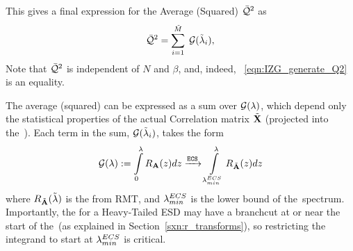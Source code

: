 This gives a final expression for the Average \LayerQuality (Squared) $\bar{\mathcal{Q}}^{2}$ as
\begin{equation}
\label{eqn:Q2_result}
\bar{\mathcal{Q}}^{2} = \sum\limits_{i=1}^{\tilde{M}}\;\mathcal{G}(\tilde{\lambda}_{i}),
\end{equation}
Note that $\bar{\mathcal{Q}}^{2}$ is independent of $N$ and $\beta$,
and, indeed, \EQN~\ref{eqn:IZG_generate_Q2} is an equality.

The average \Quality (squared) can be expressed as a sum over
\GeneratingFunctions $\mathcal{G(\lambda)}$, which depend only the statistical properties of the
actual \Teacher Correlation  matrix  $\tilde{\mathbf{X}}$ (projected into the~\ECS).
Each term in the sum, $\mathcal{G}(\tilde{\lambda}_{i})$, takes the form
\begin{equation}
\label{eqn:generating_function_A}
 \mathcal{G(\lambda)}:=\int\limits_{0}^{\lambda}R_{\mathbf{A}}(z)dz \xrightarrow{\text{\texttt{ECS}}}\int\limits_{\lambda^{ECS}_{min}}^{\lambda}R_{\tilde{\mathbf{A}}}(z)dz
\end{equation}
where $R_{\tilde{\mathbf{A}}}(\tilde{\lambda})$ is the \RTransform from RMT,
and $\lambda^{ECS}_{min}$ is the lower bound of the~\ECS spectrum.
Importantly, the \RTransform for a Heavy-Tailed ESD may have a branchcut at or near the
start of the~\ECS (as explained in Section~\ref{sxn:r_transforms}), so restricting the integrand
to start at $\lambda^{ECS}_{min}$ is critical.


%
%

